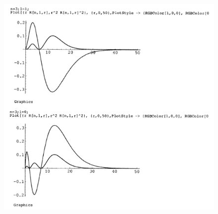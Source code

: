 \documentclass[a4paper,12pt,oneside]{book}
\begin{document}
\begin{figure}[!htbp]
\begin{center}
\includegraphics[width= \textwidth]{immagini/cap_21/fig_21_5.png}
\end{center}
\end{figure}
\end{document}
